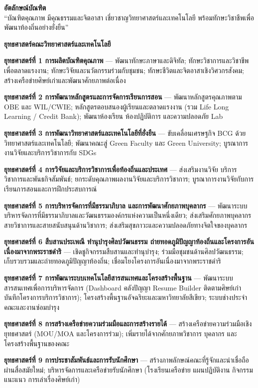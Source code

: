 \textbf{อัตลักษณ์บัณฑิต}\\
``บัณฑิตคุณภาพ มีคุณธรรมและจิตอาสา เชี่ยวชาญวิทยาศาสตร์และเทคโนโลยี พร้อมทักษะวิชาชีพเพื่อพัฒนาท้องถิ่นอย่างยั่งยืน''

\textbf{ยุทธศาสตร์คณะวิทยาศาสตร์และเทคโนโลยี}

\textbf{ยุทธศาสตร์ที่ 1 การผลิตบัณฑิตคุณภาพ} --- พัฒนาทักษะภาษาและดิจิทัล; ทักษะวิชาการและวิชาชีพเพื่อตลาดแรงงาน; ทักษะวิจัยและนวัตกรรมร่วมกับชุมชน; ทักษะชีวิตและจิตอาสาเชิงวิศวกรสังคม; สร้างเครือข่ายศิษย์เก่าและพัฒนาศักยภาพต่อเนื่อง

\textbf{ยุทธศาสตร์ที่ 2 การพัฒนาหลักสูตรและการจัดการเรียนการสอน} --- พัฒนาหลักสูตรคุณภาพตาม OBE และ WIL/CWIE; หลักสูตรตอบสนองผู้เรียนและตลาดแรงงาน (รวม Life Long Learning / Credit Bank); พัฒนาห้องเรียน ห้องปฏิบัติการ และความปลอดภัย Lab

\textbf{ยุทธศาสตร์ที่ 3 การพัฒนาวิทยาศาสตร์และเทคโนโลยีที่ยั่งยืน} --- ขับเคลื่อนเศรษฐกิจ BCG ด้วยวิทยาศาสตร์และเทคโนโลยี; พัฒนาคณะสู่ Green Faculty และ Green University; บูรณาการงานวิจัยและบริการวิชาการกับ SDGs

\textbf{ยุทธศาสตร์ที่ 4 การวิจัยและบริการวิชาการเพื่อท้องถิ่นและประเทศ} --- ส่งเสริมงานวิจัย บริการวิชาการและพันธกิจสัมพันธ์; ยกระดับคุณภาพผลงานวิจัยและบริการวิชาการ; บูรณาการงานวิจัยกับการเรียนการสอนและการฝึกประสบการณ์

\textbf{ยุทธศาสตร์ที่ 5 การบริหารจัดการที่มีธรรมาภิบาล และการพัฒนาศักยภาพบุคลากร} --- พัฒนาระบบบริหารจัดการที่มีธรรมาภิบาลและวัฒนธรรมองค์กรแห่งความเป็นหนึ่งเดียว; ส่งเสริมศักยภาพบุคลากรสายวิชาการและสายสนับสนุนด้านวิชาการ; ส่งเสริมสุขภาวะและความปลอดภัยทางจิตใจของบุคลากร

\textbf{ยุทธศาสตร์ที่ 6 สืบสานประเพณี ทำนุบำรุงศิลปวัฒนธรรม ถ่ายทอดภูมิปัญญาท้องถิ่นและโครงการอันเนื่องมาจากพระราชดำริ} --- เชิดชูกิจกรรมสืบสานและทำนุบำรุง; ร่วมมือชุมชนด้านศิลปวัฒนธรรม; เก็บรวบรวมและถ่ายทอดภูมิปัญญาท้องถิ่น; เชื่อมโยงโครงการอันเนื่องมาจากพระราชดำริ

\textbf{ยุทธศาสตร์ที่ 7 การพัฒนาระบบเทคโนโลยีสารสนเทศและโครงสร้างพื้นฐาน} --- พัฒนาระบบสารสนเทศเพื่อการบริหารจัดการ (Dashboard คลังปัญญา Resume Builder ติดตามศิษย์เก่า บันทึกโครงการบริการวิชาการ); โครงสร้างพื้นฐานอัจฉริยะและมหาวิทยาลัยสีเขียว; ระบบช่างประจำคณะและงานซ่อมบำรุง

\textbf{ยุทธศาสตร์ที่ 8 การสร้างเครือข่ายความร่วมมือและการสร้างรายได้} --- สร้างเครือข่ายความร่วมมือเชิงยุทธศาสตร์ (MOU/MOA และโครงการร่วม); เพิ่มรายได้จากศักยภาพวิชาการ บุคลากร และโครงสร้างพื้นฐานของคณะ

\textbf{ยุทธศาสตร์ที่ 9 การประชาสัมพันธ์และการรับนักศึกษา} --- สร้างภาพลักษณ์คณะที่รู้จักและน่าเชื่อถือผ่านสื่อสมัยใหม่; บริหารจัดการและเครือข่ายรับนักศึกษา (โรงเรียนเครือข่าย แผนปฏิบัติงาน กิจกรรมแนะแนว การเล่าเรื่องศิษย์เก่า)

